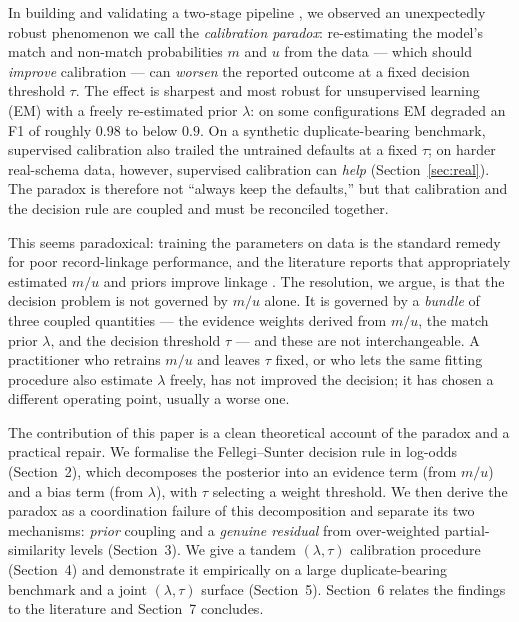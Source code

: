 \documentclass[conference]{IEEEtran}
\begin{document}
In building and validating a two-stage pipeline \cite{pipeline}, we observed an unexpectedly robust
phenomenon we call the \emph{calibration paradox}: re-estimating the model's match and
non-match probabilities $m$ and $u$ from the data --- which should \emph{improve}
calibration --- can \emph{worsen} the reported outcome at a fixed decision threshold $\tau$.
The effect is sharpest and most robust for unsupervised learning (EM) with a freely
re-estimated prior $\lambda$: on some configurations EM degraded an F1 of roughly $0.98$ to
below $0.9$. On a synthetic duplicate-bearing benchmark, supervised calibration also trailed
the untrained defaults at a fixed $\tau$; on harder real-schema data, however, supervised
calibration can \emph{help} (Section~\ref{sec:real}). The paradox is therefore not ``always
keep the defaults,'' but that calibration and the decision rule are coupled and must be
reconciled together.

This seems paradoxical: training the parameters on data is the standard remedy for poor
record-linkage performance, and the literature reports that appropriately estimated $m/u$
and priors improve linkage \cite{winkler1993,winkler2000}. The resolution, we argue, is
that the decision problem is not governed by $m/u$ alone. It is governed by a \emph{bundle}
of three coupled quantities --- the evidence weights derived from $m/u$, the match prior
$\lambda$, and the decision threshold $\tau$ --- and these are not interchangeable. A
practitioner who retrains $m/u$ and leaves $\tau$ fixed, or who lets the same fitting
procedure also estimate $\lambda$ freely, has not improved the decision; it has chosen a
different operating point, usually a worse one.

The contribution of this paper is a clean theoretical account of the paradox and a practical
repair. We formalise the Fellegi--Sunter decision rule in log-odds (Section~2), which
decomposes the posterior into an evidence term (from $m/u$) and a bias term (from
$\lambda$), with $\tau$ selecting a weight threshold. We then derive the paradox as a
coordination failure of this decomposition and separate its two mechanisms: \emph{prior}
coupling and a \emph{genuine residual} from over-weighted partial-similarity levels
(Section~3). We give a tandem $(\lambda,\tau)$ calibration procedure (Section~4) and
demonstrate it empirically on a large duplicate-bearing benchmark and a joint
$(\lambda,\tau)$ surface (Section~5). Section~6 relates the findings to the literature and
Section~7 concludes.
\end{document}
